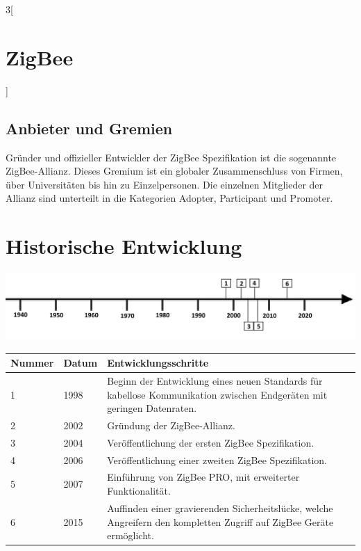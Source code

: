\begin{multicols}{3}[\section{ZigBee}]
\subsection*{Anbieter und Gremien}
Gründer und offizieller Entwickler der ZigBee Spezifikation ist die sogenannte ZigBee-Allianz. Dieses Gremium ist ein globaler Zusammenschluss von Firmen, über Universitäten bis hin zu Einzelpersonen. Die einzelnen Mitglieder der Allianz sind unterteilt in die Kategorien Adopter, Participant und Promoter.


\end{multicols}
\newpage
\section*{Historische Entwicklung}
\includegraphics[width=\textwidth]{Kapitel/ZigBee/Grafiken/Zeitstrahl}
\par
\noindent
\begin{tabular}{|p{1 cm}|p{3 cm}|p{13.55 cm}|}
	\hline
	Nummer & Datum & Entwicklungsschritte~\cite{zigbee.5}\\
	\hline
	1 & 1998 & Beginn der Entwicklung eines neuen Standards für kabellose Kommunikation zwischen Endgeräten mit geringen Datenraten.\\
	\hline
	2 & 2002 & Gründung der ZigBee-Allianz.\\
	\hline
	3 & 2004 & Veröffentlichung der ersten ZigBee Spezifikation.\\
	\hline
	4 & 2006 & Veröffentlichung einer zweiten ZigBee Spezifikation.\\
	\hline
	5 & 2007 & Einführung von ZigBee PRO, mit erweiterter Funktionalität.\\
	\hline
	6 & 2015 & Auffinden einer gravierenden Sicherheitslücke, welche Angreifern den kompletten Zugriff auf ZigBee Geräte ermöglicht.\\
	\hline
\end{tabular}
\par
